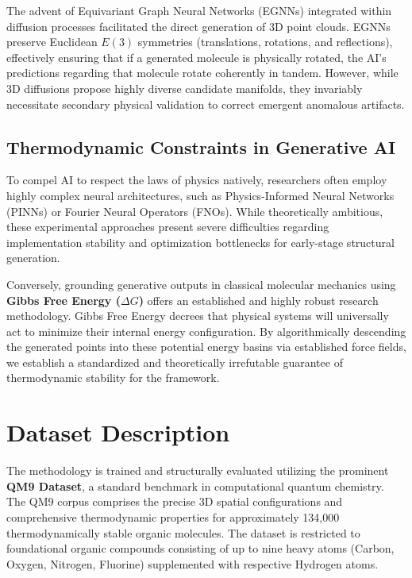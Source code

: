 \documentclass[conference]{IEEEtran}
\begin{document}
The advent of Equivariant Graph Neural Networks (EGNNs) integrated within diffusion processes facilitated the direct generation of 3D point clouds. EGNNs preserve Euclidean $E(3)$ symmetries (translations, rotations, and reflections), effectively ensuring that if a generated molecule is physically rotated, the AI's predictions regarding that molecule rotate coherently in tandem. However, while 3D diffusions propose highly diverse candidate manifolds, they invariably necessitate secondary physical validation to correct emergent anomalous artifacts.

\subsection{Thermodynamic Constraints in Generative AI}
To compel AI to respect the laws of physics natively, researchers often employ highly complex neural architectures, such as Physics-Informed Neural Networks (PINNs) or Fourier Neural Operators (FNOs). While theoretically ambitious, these experimental approaches present severe difficulties regarding implementation stability and optimization bottlenecks for early-stage structural generation.

Conversely, grounding generative outputs in classical molecular mechanics using \textbf{Gibbs Free Energy ($\Delta G$)} offers an established and highly robust research methodology. Gibbs Free Energy decrees that physical systems will universally act to minimize their internal energy configuration. By algorithmically descending the generated points into these potential energy basins via established force fields, we establish a standardized and theoretically irrefutable guarantee of thermodynamic stability for the framework.

\section{Dataset Description}

The methodology is trained and structurally evaluated utilizing the prominent \textbf{QM9 Dataset}, a standard benchmark in computational quantum chemistry. The QM9 corpus comprises the precise 3D spatial configurations and comprehensive thermodynamic properties for approximately 134,000 thermodynamically stable organic molecules. The dataset is restricted to foundational organic compounds consisting of up to nine heavy atoms (Carbon, Oxygen, Nitrogen, Fluorine) supplemented with respective Hydrogen atoms.
\end{document}
